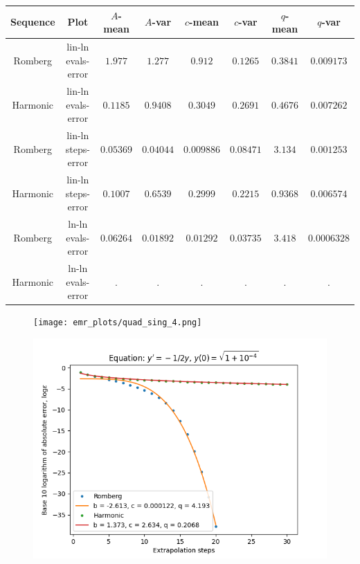 \begin{table}[H]
    \centering
    \small
    \begin{tabular}{c|c||c|c|c|c|c|c}
Sequence & Plot & \(A\)-mean & \(A\)-var & \(c\)-mean & \(c\)-var & \(q\)-mean & \(q\)-var\\\hline
Romberg & lin-ln evals-error & \(1.977\) & \(1.277\) & \(0.912\) & \(0.1265\) & \(0.3841\) & \(0.009173\) \\
Harmonic & lin-ln evals-error & \(0.1185\) & \(0.9408\) & \(0.3049\) & \(0.2691\) & \(0.4676\) & \(0.007262\) \\
Romberg & lin-ln steps-error & \(0.05369\) & \(0.04044\) & \(0.009886\) & \(0.08471\) & \(3.134\) & \(0.001253\) \\
Harmonic & lin-ln steps-error & \(0.1007\) & \(0.6539\) & \(0.2999\) & \(0.2215\) & \(0.9368\) & \(0.006574\) \\
Romberg & ln-ln evals-error & \(0.06264\) & \(0.01892\) & \(0.01292\) & \(0.03735\) & \(3.418\) & \(0.0006328\) \\
Harmonic & ln-ln evals-error & . & . & . & . & . & . \\
    \end{tabular}
    \label{tab:my_label}
\end{table}

\begin{figure}[H]
\centering
\begin{minipage}{0.45\textwidth}
\centering
\texttt{[image: emr\_plots/quad\_sing\_4.png]}
\end{minipage}
\begin{minipage}{0.45\textwidth}
\centering
\includegraphics[scale=0.45]{emr_plots/quad_sing_4_hp_steps.png}
\end{minipage}
\end{figure}

